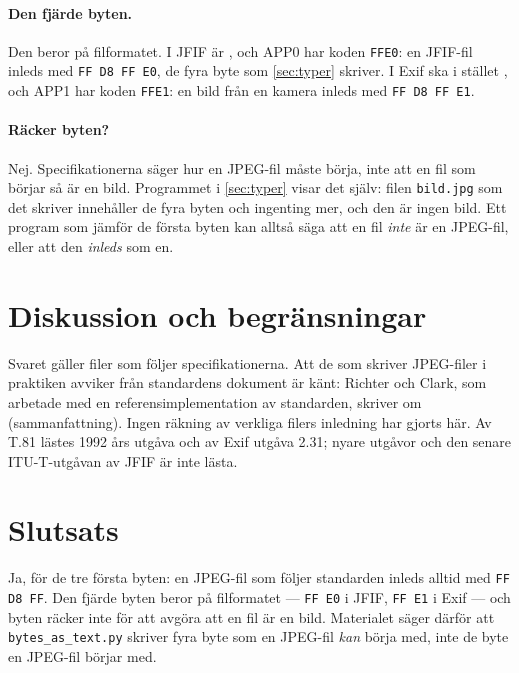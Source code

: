 \paragraph{Den fjärde byten.}  Den beror på filformatet.  I JFIF är
, och APP0 har koden
\texttt{FFE0}\autocite[32]{ITUT81}: en JFIF-fil inleds med \texttt{FF
D8 FF E0}, de fyra byte som \cref{sec:typer} skriver.  I Exif ska i
stället , och APP1 har koden
\texttt{FFE1}\autocite[86]{CIPA2016Exif}: en bild från en kamera inleds
med \texttt{FF D8 FF E1}.

\paragraph{Räcker byten?}  Nej.  Specifikationerna säger hur en JPEG-fil
måste börja, inte att en fil som börjar så är en bild.  Programmet i
\cref{sec:typer} visar det själv: filen \texttt{bild.jpg} som det skriver
innehåller de fyra byten och ingenting mer, och den är ingen bild.  Ett
program som jämför de första byten kan alltså säga att en fil
\emph{inte} är en JPEG-fil, eller att den \emph{inleds} som en.

\section{Diskussion och begränsningar}
\label{sec:jpeg-diskussion}

Svaret gäller filer som följer specifikationerna.  Att de som skriver
JPEG-filer i praktiken avviker från standardens dokument är känt:
Richter och Clark, som arbetade med en referensimplementation av
standarden, skriver om 
(sammanfattning).  Ingen räkning av verkliga filers inledning har gjorts
här.  Av T.81 lästes 1992 års utgåva och av Exif utgåva 2.31; nyare
utgåvor och den senare ITU-T-utgåvan av JFIF är inte lästa.

\section{Slutsats}
\label{sec:jpeg-slutsats}

Ja, för de tre första byten: en JPEG-fil som följer standarden inleds
alltid med \texttt{FF D8 FF}\autocite[31, 34]{ITUT81}.  Den fjärde byten
beror på filformatet --- \texttt{FF E0} i JFIF\autocite[3]{Hamilton1992JFIF},
\texttt{FF E1} i Exif\autocite[86, 91]{CIPA2016Exif} --- och byten räcker inte
för att avgöra att en fil är en bild.  Materialet säger därför att
\texttt{bytes\_as\_text.py} skriver fyra byte som en JPEG-fil
\emph{kan} börja med, inte de byte en JPEG-fil börjar med.

